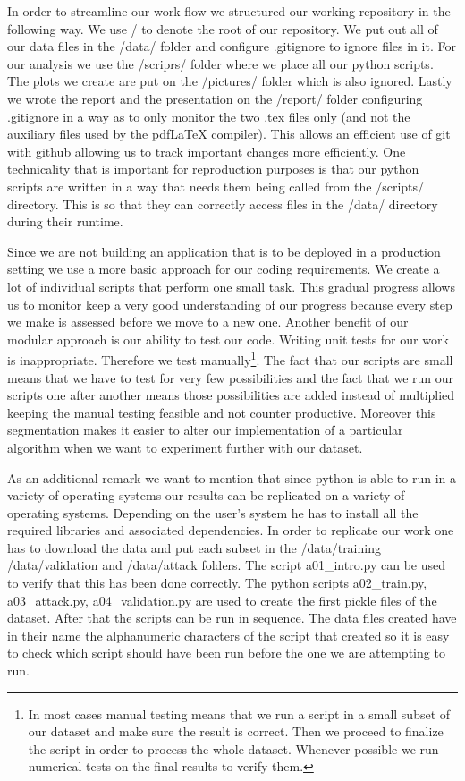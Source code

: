 \documentclass[reqno,openany,12pt]{amsbook}
\begin{document}
In order to streamline our work flow we structured our working repository in the following way. We use / to denote the root of our repository. We put out all of our data files in the /data/ folder and configure .gitignore to ignore files in it. For our analysis we use the /scriprs/ folder where we place all our python scripts. The plots we create are put on the /pictures/ folder which is also ignored. Lastly we wrote the report and the presentation on the /report/ folder configuring .gitignore in a way as to only monitor the two .tex files only (and not the auxiliary files used by the pdfLaTeX compiler). This allows an efficient use of git with github allowing us to track important changes more efficiently. One technicality that is important for reproduction purposes is that our python scripts are written in a way that needs them being called from the /scripts/ directory. This is so that they can correctly access files in the /data/ directory during their runtime.


Since we are not building an application that is to be deployed in a production setting we use a more basic approach for our coding requirements. We create a lot of individual scripts that perform one small task. This gradual progress allows us to monitor keep a very good understanding of our progress because every step we make is assessed before we move to a new one. Another benefit of our modular approach is our ability to test our code. Writing unit tests for our work is inappropriate. Therefore we test manually\footnote{In most cases manual testing means that we run a script in a small subset of our dataset and make sure the result is correct. Then we proceed to finalize the script in order to process the whole dataset. Whenever possible we run numerical tests on the final results to verify them.}. The fact that our scripts are small means that we have to test for very few possibilities and the fact that we run our scripts one after another means those possibilities are added instead of multiplied keeping the manual testing feasible and not counter productive. Moreover this segmentation makes it easier to alter our implementation of a particular algorithm when we want to experiment further with our dataset.

As an additional remark we want to mention that  since python is able to run in a variety of operating systems our results can be replicated on a variety of operating systems. Depending on the user's system he has to install all the required libraries and associated dependencies. In order to replicate our work one has to download the data and put each subset in the /data/training /data/validation and /data/attack folders. The script a01\_{}intro.py can be used to verify that this has been done correctly. The python scripts  a02\_{}train.py, a03\_{}attack.py, a04\_{}validation.py are used to create the first pickle files of the dataset. After that the scripts can be run in sequence. The data files created have in their name the alphanumeric characters of the script that created so it is easy to check which script should have been run before the one we are attempting to run.
\end{document}
